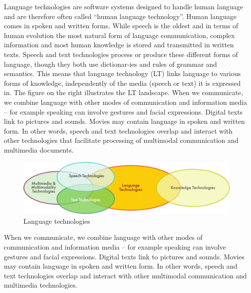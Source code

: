 \clearpage


\begin{multicols}{2}

Language technologies are software systems designed to handle human language and are therefore often called “human language technology”. Human language comes in spoken and written forms. While speech is the oldest and in terms of human evolution the most natural form of language communication, complex information and most human knowledge is stored and transmitted in written texts. Speech and text technologies process or produce these different forms of language, though they both use dictionar-ies and rules of grammar and semantics. This means that language technology (LT) links language to various forms of knowledge, independently of the media (speech or text) it is expressed in. The figure on the right illustrates the LT landscape. When we communicate, we combine language with other modes of communication and information media – for example speaking can involve gestures and facial expressions. Digital texts link to pictures and sounds. Movies may contain language in spoken and written form. In other words, speech and text technologies overlap and interact with other technologies that facilitate processing of multimodal communication and multimedia documents. 

\begin{figure}[htb]
  \center
  \includegraphics[width=\textwidth]{../_media/english/language_technologies}
  \caption{Language technologies}
  \label{fig:ltincontext_en}
\end{figure}

When we communicate, we combine language with other modes of communication and information media – for example speaking can involve gestures and facial expressions. Digital texts link to pictures and sounds. Movies may contain language in spoken and written form. In other words, speech and text technologies overlap and interact with other multimodal communication and multimedia technologies.


\end{multicols}
